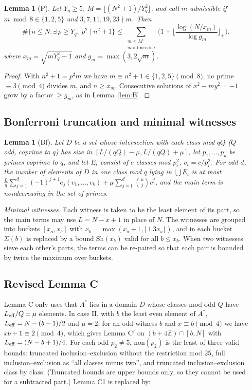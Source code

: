 \documentclass[11pt]{amsart}
\newtheorem{lemma}[theorem]{Lemma}
\theoremstyle{definition}
\theoremstyle{remark}
\newcommand{\Z}{\mathbb{Z}}
\newcommand{\Sh}{\mathrm{Sh}}
\begin{document}
\begin{lemma}[P]
Let $Y_q\ge5$, $M=\lfloor(N^2+1)/Y_q^2\rfloor$, and call $m$ \emph{admissible} if
$m\bmod8\in\{1,2,5\}$ and $3,7,11,19,23\nmid m$. Then
\[
\#\{n\le N:\exists\,p\ge Y_q,\ p^2\mid n^2+1\}\le\sum_{\substack{m\le M\\ m\text{ admissible}}}
\Big(1+\Big\lfloor\frac{\log(N/x_m)}{\log g_m}\Big\rfloor_+\Big),
\]
where $x_m=\sqrt{mY_q^2-1}$ and $g_m=\max(3,2\sqrt m)$.
\end{lemma}

\begin{proof}
With $n^2+1=p^2m$ we have $m\equiv n^2+1\in\{1,2,5\}\pmod8$, no prime
$\equiv3\pmod4$ divides $m$, and $n\ge x_m$. Consecutive solutions of
$x^2-my^2=-1$ grow by a factor $\ge g_m$, as in Lemma~\ref{lem:B}.
\end{proof}

\subsection{Bonferroni truncation and minimal witnesses}
\begin{lemma}[Bf]
Let $D$ be a set whose intersection with each class mod $qQ$ ($Q$ odd, coprime to $q$)
has size in $[L/(qQ)-\mu,L/(qQ)+\mu]$, let $p_1,\dots,p_k$ be primes coprime to $q$,
and let $E_i$ consist of $c$ classes mod $p_i^2$, $v_i=c/p_i^2$. For odd $d$, the
number of elements of $D$ in one class mod $q$ lying in $\bigcup E_i$ is at most
$\frac Lq\sum_{j=1}^d(-1)^{j+1}e_j(v_1,\dots,v_k)+\mu\sum_{j=1}^d\binom kjc^j$, and the
main term is nondecreasing in the set of primes.
\end{lemma}

\emph{Minimal witnesses.} Each witness is taken to be the least element of its part,
so the main terms may use $L=N-x+1$ in place of $N$. The witnesses are grouped into
buckets $[x_a,x_b]$ with $x_b=\max(x_a+1,\lfloor1.3x_a\rfloor)$, and in each bucket
$\Sigma(b)$ is replaced by a bound $\Sh(x_b)$ valid for all $b\le x_b$. When two
witnesses sieve each other's parts, the terms can be re-paired so that each pair is
bounded by twice the maximum over buckets.

\subsection{Revised Lemma C}
Lemma C only uses that $A^*$ lies in a domain $D$ whose classes mod odd $Q$ have
$L_{\rm eff}/Q\pm\mu$ elements. In case II, with $b$ the least even element of $A^*$,
$L_{\rm eff}=N-(b-1)/2$ and $\mu=2$; for an odd witness $b$ and $x\equiv b\pmod4$
we have $xb+1\equiv2\pmod4$, which gives Lemma C$'$ on $(b+4\Z)\cap[b,N]$ with
$L_{\rm eff}=(N-b+1)/4$. For each odd $p_2\ne5$, $\mathrm{non}(p_2)$ is the least of
three valid bounds: truncated inclusion--exclusion without the restriction mod 25,
full inclusion--exclusion as ``all classes minus two'', and truncated
inclusion--exclusion class by class. (Truncated bounds are upper bounds only, so
they cannot be used for a subtracted part.) Lemma C1 is replaced by:
\end{document}
